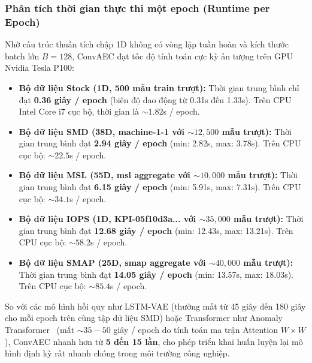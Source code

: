 \documentclass[11pt,journal,onecolumn]{IEEEtran}
\begin{document}
\subsubsection{Phân tích thời gian thực thi một epoch (Runtime per Epoch)}
Nhờ cấu trúc thuần tích chập 1D không có vòng lặp tuần hoàn và kích thước batch lớn $B = 128$, ConvAEC đạt tốc độ tính toán cực kỳ ấn tượng trên GPU Nvidia Tesla P100:
\begin{itemize}
    \item \textbf{Bộ dữ liệu Stock (1D, 500 mẫu train trượt):} Thời gian trung bình chỉ đạt \textbf{0.36 giây / epoch} (biên độ dao động từ 0.31s đến 1.33s). Trên CPU Intel Core i7 cục bộ, thời gian là $\sim 1.82$s / epoch.
    \item \textbf{Bộ dữ liệu SMD (38D, machine-1-1 với $\sim 12,500$ mẫu trượt):} Thời gian trung bình đạt \textbf{2.94 giây / epoch} (min: 2.82s, max: 3.78s). Trên CPU cục bộ: $\sim 22.5$s / epoch.
    \item \textbf{Bộ dữ liệu MSL (55D, msl aggregate với $\sim 10,000$ mẫu trượt):} Thời gian trung bình đạt \textbf{6.15 giây / epoch} (min: 5.91s, max: 7.31s). Trên CPU cục bộ: $\sim 34.1$s / epoch.
    \item \textbf{Bộ dữ liệu IOPS (1D, KPI-05f10d3a... với $\sim 35,000$ mẫu trượt):} Thời gian trung bình đạt \textbf{12.68 giây / epoch} (min: 12.43s, max: 13.21s). Trên CPU cục bộ: $\sim 58.2$s / epoch.
    \item \textbf{Bộ dữ liệu SMAP (25D, smap aggregate với $\sim 40,000$ mẫu trượt):} Thời gian trung bình đạt \textbf{14.05 giây / epoch} (min: 13.57s, max: 18.03s). Trên CPU cục bộ: $\sim 85.4$s / epoch.
\end{itemize}

So với các mô hình hồi quy như LSTM-VAE (thường mất từ 45 giây đến 180 giây cho mỗi epoch trên cùng tập dữ liệu SMD) hoặc Transformer như Anomaly Transformer~\cite{xu2022anomaly} (mất $\sim 35-50$ giây / epoch do tính toán ma trận Attention $W \times W$), ConvAEC nhanh hơn từ \textbf{5 đến 15 lần}, cho phép triển khai huấn luyện lại mô hình định kỳ rất nhanh chóng trong môi trường công nghiệp.
\end{document}
